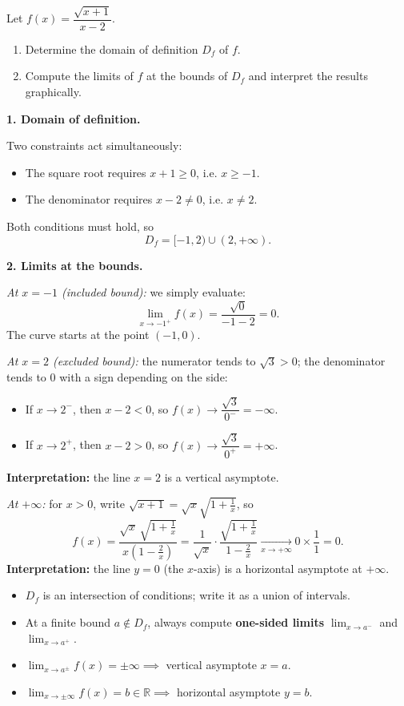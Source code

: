\documentclass[11pt]{article}
\newcommand{\cle}[1]{{\popxbold\color{popdark}#1}}
\begin{document}
\begin{exemplebox}
Let $f(x) = \dfrac{\sqrt{x+1}}{x-2}$.
\begin{enumerate}
\item Determine the domain of definition $D_f$ of $f$.
\item Compute the limits of $f$ at the bounds of $D_f$ and interpret the results graphically.
\end{enumerate}
\tcblower
\textbf{1. Domain of definition.}

Two constraints act simultaneously:
\begin{itemize}
\item The square root requires $x + 1 \geq 0$, i.e. $x \geq -1$.
\item The denominator requires $x - 2 \neq 0$, i.e. $x \neq 2$.
\end{itemize}
Both conditions must hold, so
\[ D_f = [-1, 2) \cup (2, +\infty). \]

\textbf{2. Limits at the bounds.}

\emph{At $x = -1$ (included bound):} we simply evaluate:
\[ \lim_{x \to -1^+} f(x) = \frac{\sqrt{0}}{-1-2} = 0. \]
The curve starts at the point $(-1, 0)$.

\emph{At $x = 2$ (excluded bound):} the numerator tends to $\sqrt{3} > 0$; the denominator tends to $0$ with a sign depending on the side:
\begin{itemize}
\item If $x \to 2^-$, then $x - 2 < 0$, so $f(x) \to \dfrac{\sqrt{3}}{0^-} = -\infty$.
\item If $x \to 2^+$, then $x - 2 > 0$, so $f(x) \to \dfrac{\sqrt{3}}{0^+} = +\infty$.
\end{itemize}
\textbf{Interpretation:} the line $x = 2$ is a \cle{vertical asymptote}.

\emph{At $+\infty$:} for $x > 0$, write $\sqrt{x+1} = \sqrt{x}\sqrt{1 + \tfrac{1}{x}}$, so
\[ f(x) = \frac{\sqrt{x}\,\sqrt{1+\frac1x}}{x\left(1-\frac2x\right)} = \frac{1}{\sqrt{x}}\cdot\frac{\sqrt{1+\frac1x}}{1-\frac2x} \xrightarrow[x\to+\infty]{} 0 \times \frac{1}{1} = 0. \]
\textbf{Interpretation:} the line $y = 0$ (the $x$-axis) is a \cle{horizontal asymptote} at $+\infty$.
\end{exemplebox}

\begin{aretenir}
\begin{itemize}
\item $D_f$ is an intersection of conditions; write it as a union of intervals.
\item At a finite bound $a \notin D_f$, always compute \textbf{one-sided limits} $\lim_{x\to a^-}$ and $\lim_{x\to a^+}$.
\item $\lim_{x\to a^\pm} f(x) = \pm\infty \implies$ vertical asymptote $x = a$.
\item $\lim_{x\to\pm\infty} f(x) = b \in \mathbb{R} \implies$ horizontal asymptote $y = b$.
\end{itemize}
\end{aretenir}
\end{document}
